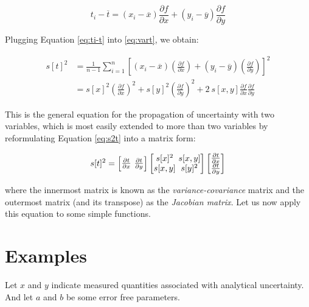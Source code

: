 \begin{equation}
t_i - \overline{t} = (x_i-\overline{x}) \frac{\partial f}{\partial x} +
(y_i-\overline{y}) \frac{\partial f}{\partial y}
\label{eq:ti-t}
\end{equation}

Plugging Equation \ref{eq:ti-t} into \ref{eq:vart}, we obtain:

\begin{align}
s[t]^2 & = \frac{1}{n-1} \sum_{i=1}^{n} \left[
(x_i-\overline{x}) \left(\frac{\partial f}{\partial x}\right) +
(y_i-\overline{y}) \left(\frac{\partial f}{\partial y}\right) \right]^2 \label{eq:s2t1}\\
~ & = s[x]^2 \left(\frac{\partial f}{\partial x}\right)^2 +
s[y]^2 \left(\frac{\partial f}{\partial y}\right)^2 +
2~s[x,y] \frac{\partial f}{\partial x} \frac{\partial f}{\partial y} \label{eq:s2t}
\end{align}

This is the general equation for the propagation of uncertainty with
two variables, which is most easily extended to more than two
variables by reformulating Equation \ref{eq:s2t} into a matrix form:

\begin{equation}
s[t]^2 = 
\left[
\begin{array}{@{}c@{~}c@{}}
\frac{\partial t}{\partial x}&\frac{\partial t}{\partial y}
\end{array}
\right]
\left[
\begin{array}{@{}c@{~}c@{}}
s[x]^2 & s[x,y]\\
s[x,y] & s[y]^2
\end{array}
\right]
\left[
\begin{array}{@{}c@{}}
\frac{\partial t}{\partial x} \\
\frac{\partial t}{\partial y}
\end{array}
\right]
\label{eq:s2tmatrix}
\end{equation}

where the innermost matrix is known as the \emph{variance-covariance}
matrix and the outermost matrix (and its transpose) as the
\emph{Jacobian matrix}.  Let us now apply this equation to some simple
functions.

\section{Examples}

Let $x$ and $y$ indicate measured quantities associated with
analytical uncertainty.  And let $a$ and $b$ be some error free
parameters.

